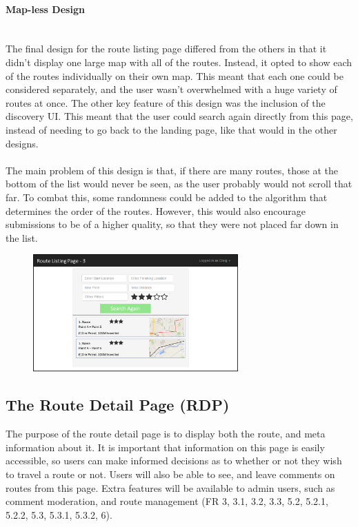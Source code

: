 \paragraph{Map-less Design}\ \\
The final design for the route listing page differed from the others in that it didn't display one large map with all of the routes. Instead, it opted to show each of the routes individually on their own map. This meant that each one could be considered separately, and the user wasn't overwhelmed with a huge variety of routes at once. The other key feature of this design was the inclusion of the discovery UI. This meant that the user could search again directly from this page, instead of needing to go back to the landing page, like that would in the other designs.\ \\
\ \\
The main problem of this design is that, if there are many routes, those at the bottom of the list would never be seen, as the user probably would not scroll that far. To combat this, some randomness could be added to the algorithm that determines the order of the routes. However, this would also encourage submissions to be of a higher quality, so that they were not placed far down in the list.
\begin{figure}[!ht]
	\begin{center}
		\includegraphics[width=0.7\textwidth]{images/ui-rlp-3.png}
	\end{center}
	\vspace{-9mm}
\end{figure}

\subsection{The Route Detail Page (RDP)}
The purpose of the route detail page is to display both the route, and meta information about it. It is important that information on this page is easily accessible, so users can make informed decisions as to whether or not they wish to travel a route or not. Users will also be able to see, and leave comments on routes from this page. Extra features will be available to admin users, such as comment moderation, and route management (FR 3, 3.1, 3.2, 3.3, 5.2, 5.2.1, 5.2.2, 5.3, 5.3.1, 5.3.2, 6).

